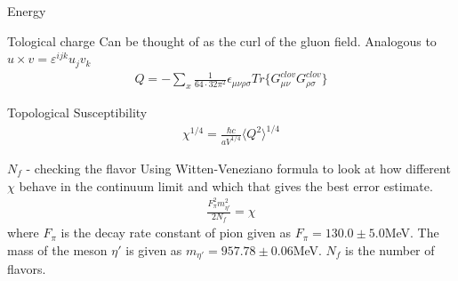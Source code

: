 \documentclass[10pt]{beamer}
\begin{document}
\begin{frame}{Energy}
\end{frame}

\begin{frame}{Tological charge}
	Can be thought of as the curl of the gluon field. Analogous to $u \times v = \varepsilon^{ijk} u_j v_k$
	\begin{align}
		Q = - \sum_x \frac{1}{64 \cdot 32\pi^2}\epsilon_{\mu\nu\rho\sigma}Tr\{G^{clov}_{\mu\nu}G^{clov}_{\rho\sigma}\}
	\end{align}
\end{frame}

\begin{frame}{Topological Susceptibility}
	\begin{align}
		\chi^{1/4} = \frac{\hbar c}{aV^{1/4}}\langle Q^2 \rangle^{1/4}
	\end{align}
\end{frame}

\begin{frame}{$N_f$ - checking the flavor}
	Using Witten-Veneziano formula to look at how different $\chi$ behave in the continuum limit and which that gives the best error estimate.
	\begin{align*}
		\frac{F_\pi^2 m_{\eta'}^2}{2 N_f} = \chi
	\end{align*}
	where $F_\pi$ is the decay rate constant of pion given as $F_\pi=130.0\pm5.0$MeV. The mass of the meson $\eta'$ is given as $m_{\eta'}=957.78\pm0.06$MeV. $N_f$ is the number of flavors.
\end{frame}


\end{document}
